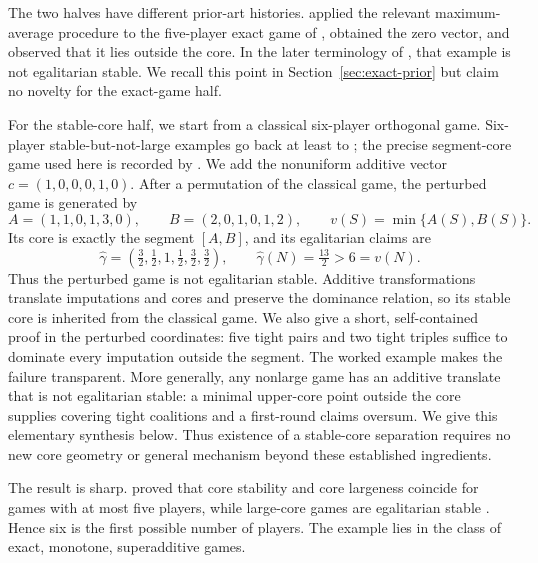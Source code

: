 \documentclass[11pt]{article}
\begin{document}
The two halves have different prior-art histories.
\citet[][Example~5, pp.~40--41]{Mauri2017} applied the relevant maximum-average procedure
to the five-player exact game of \citet{Biswas1999}, obtained the zero vector,
and observed that it lies outside the core. In the later terminology of
\citet{Dietzenbacher2021}, that example is not egalitarian stable. We recall
this point in Section~\ref{sec:exact-prior} but claim no novelty for the
exact-game half.

For the stable-core half, we start from a classical six-player orthogonal
game. Six-player stable-but-not-large examples go back at least to
\citet{Biswas2001}; the precise segment-core game used here is recorded by
\citet[][Example~4.3]{Shellshear2009}. We add the nonuniform additive vector
$c=(1,0,0,0,1,0)$. After a permutation of the classical game, the perturbed
game is generated by
\[
 A=(1,1,0,1,3,0),\qquad B=(2,0,1,0,1,2),\qquad
 v(S)=\min\{A(S),B(S)\}.
\]
Its core is exactly the segment $[A,B]$, and its egalitarian claims are
\[
 \widehat\gamma
   =\left(\tfrac32,\tfrac12,1,\tfrac12,\tfrac32,\tfrac32\right),
 \qquad
 \widehat\gamma(N)=\tfrac{13}{2}>6=v(N).
\]
Thus the perturbed game is not egalitarian stable. Additive transformations
translate imputations and cores and preserve the dominance relation, so its
stable core is inherited from the classical game. We also give a short,
self-contained proof in the perturbed coordinates: five tight pairs and two
tight triples suffice to dominate every imputation outside the segment. The
worked example makes the failure transparent. More generally, any nonlarge
game has an additive translate that is not egalitarian stable: a minimal
upper-core point outside the core supplies covering tight coalitions and a
first-round claims oversum. We give this elementary synthesis below. Thus
existence of a stable-core separation requires no new core geometry or
general mechanism beyond these established ingredients.

The result is sharp. \citet{Estevez2012} proved that core stability and core
largeness coincide for games with at most five players, while large-core games
are egalitarian stable \citep{Dietzenbacher2021}. Hence six is the first
possible number of players. The example lies in the class of exact, monotone, superadditive games.
\end{document}
